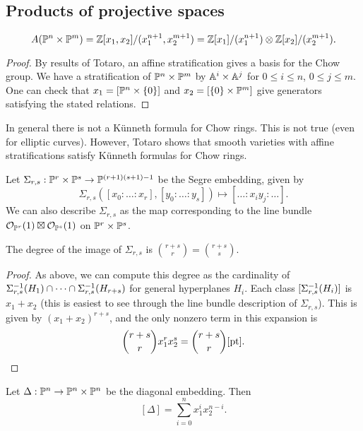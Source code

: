 \documentclass{article}
\begin{document}
\subsection{Products of projective spaces}

\begin{thm}
	\[
		A(\PP^n \times \PP^m) = \ZZ[x_1, x_2] / (x_1^{n+1}, x_2^{m+1}) = \ZZ[x_1] / (x_1^{n+1}) \otimes \ZZ[x_2] / (x_2^{m+1}).
	\]
\end{thm}

\begin{proof}
	By results of Totaro, an affine stratification gives a basis for the Chow group.
	We have a stratification of $\PP^n \times \PP^m$ by $\AA^i \times \AA^j$ for $0 \leq i \leq n$, $0 \leq j \leq m$.
	One can check that $x_1 = [\PP^n \times \{ 0 \}]$ and $x_2 = [\{ 0 \} \times \PP^m]$ give generators satisfying the stated relations.
\end{proof}

In general there is not a K\"unneth formula for Chow rings.
This is not true (even for elliptic curves).
However, Totaro shows that smooth varieties with affine stratifications satisfy K\"unneth formulas for Chow rings.

Let $\Sigma_{r,s}: \PP^r \times \PP^s \to \PP^{(r+1)(s+1)-1}$ be the Segre embedding, given by
\[
	\Sigma_{r,s}([x_0 : \dots : x_r], [y_0 : \dots : y_s]) \mapsto [\dots : x_i y_j : \dots].
\]
We can also describe $\Sigma_{r,s}$ as the map corresponding to the line bundle $\Oc_{\PP^r}(1) \boxtimes \Oc_{\PP^s}(1)$ on $\PP^r \times \PP^s$.

\begin{prop}
	The degree of the image of $\Sigma_{r,s}$ is $\binom{r+s}{r} = \binom{r+s}{s}$.
\end{prop}

\begin{proof}
	As above, we can compute this degree as the cardinality of $\Sigma_{r,s}\inv(H_1) \cap \dots \cap \Sigma_{r,s}\inv(H_{r+s})$ for general hyperplanes $H_i$.
	Each class $[\Sigma_{r,s}\inv(H_i)]$ is $x_1 + x_2$ (this is easiest to see through the line bundle description of $\Sigma_{r,s}$).
	This is given by $(x_1 + x_2)^{r+s}$, and the only nonzero term in this expansion is
	\[
		\binom{r+s}{r} x_1^r x_2^s = \binom{r+s}{r} [\pt]. \qedhere
	\]
\end{proof}

\begin{prop}
	Let $\Delta: \PP^n \to \PP^n \times \PP^n$ be the diagonal embedding.
	Then
	\[
		[\Delta] = \sum_{i=0}^n x_1^i x_2^{n-i}.
	\]
\end{prop}
\end{document}

